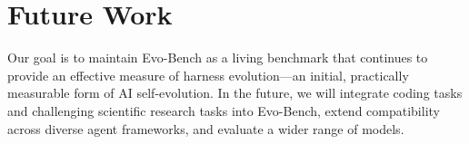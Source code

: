 \section{Future Work}

Our goal is to maintain Evo-Bench as a living benchmark that continues to
provide an effective measure of harness evolution---an initial, practically
measurable form of AI self-evolution.   In the future, we will integrate coding tasks and challenging scientific research tasks into Evo-Bench, extend compatibility across diverse agent frameworks, and evaluate a wider range of models.

